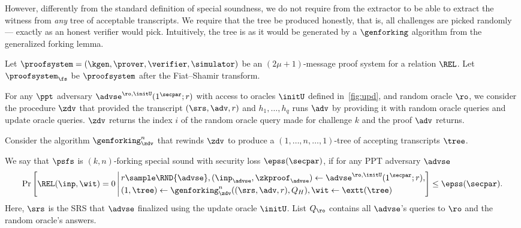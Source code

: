However, differently from the standard definition of special soundness, we do
not require from the extractor to be able to extract the witness from \emph{any}
tree of acceptable transcripts. We require that the tree be produced honestly,
that is, all challenges are picked randomly --- exactly as an honest verifier would pick.
Intuitively, the tree is as it would be generated by a $\genforking$
algorithm from the generalized forking lemma.


\begin{definition}
	Let $\proofsystem = (\kgen, \prover, \verifier, \simulator)$ be an
  $(2 \mu + 1)$-message proof system for a relation $\REL$.  Let $\proofsystem_\fs$
  be $\proofsystem$ after the Fiat--Shamir transform.
	
	For any $\ppt$ adversary $\advse^{\ro, \initU} (1^\secpar; r)$ with access to
  oracles $\initU$ defined in~\cref{fig:upd}, and random oracle $\ro$, we consider
  the procedure $\zdv$ that provided the transcript $(\srs, \adv, r)$ and
  $h_1, \ldots, h_q$ runs $\adv$ by providing it with random oracle queries and
  update oracle queries.
	$\zdv$ returns the index $i$ of the
	random oracle query made for challenge $k$ and the proof $\adv$ returns.
	
	Consider the algorithm $\genforking_{\zdv}^{n}$
	that rewinds $\zdv$ to produce a $(1,\dots, n, \dots, 1)$-tree of
	accepting transcripts $\tree$.
	
	We say that $\psfs$ is $(k,n)$-forking special sound with security loss $\epss(\secpar)$, if
	for any PPT adversary $\advse$
	\begin{align*}
	\Pr\left[
	\REL(\inp, \wit) = 0
	\,\Biggl|\,
	\begin{aligned}
	& r \sample \RND{\advse},
	(\inp_{\advse}, \zkproof_{\advse}) \gets \advse^{\ro, \initU} (1^\secpar; r), \\
	&    (1, \tree) \gets \genforking_{\zdv}^{n}((\srs,\adv,r),Q_{H}),
	\wit \gets \extt(\tree)
	\end{aligned}
	\right] \leq \epss(\secpar).
	\end{align*}
	Here, $\srs$ is the SRS that $\advse$ finalized using the update oracle $\initU$.
	List $Q_\ro$ contains all $\advse$'s
	queries to $\ro$ and the random oracle's answers.
\end{definition}

